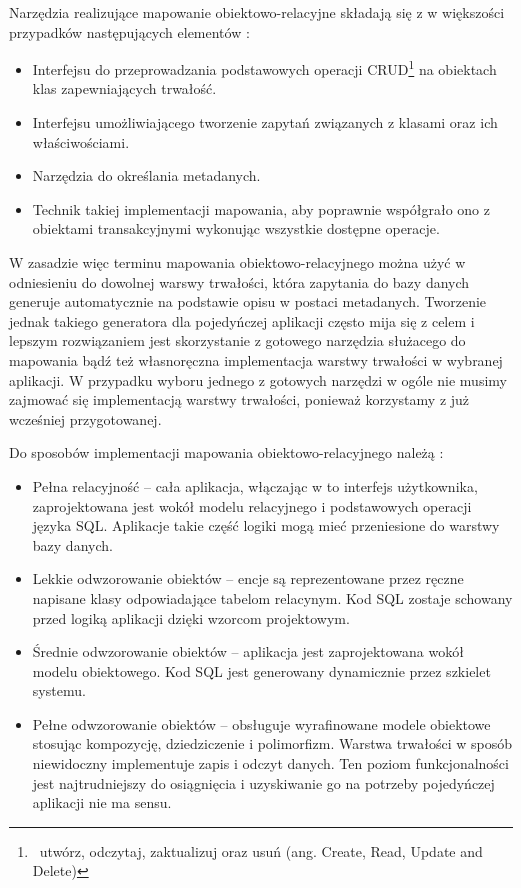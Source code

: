 \documentclass[12pt]{report}
\begin{document}
Narzędzia realizujące mapowanie obiektowo-relacyjne składają się z w wię\-kszości przypadków następujących elementów \cite{hibernate}:

\begin{itemize}
\item Interfejsu do przeprowadzania podstawowych operacji CRUD\footnote{~utwórz, odczytaj, zaktualizuj oraz usuń (ang. Create, Read, Update and Delete)} na obiektach
klas zapewniających trwałość.
\item Interfejsu umożliwiającego tworzenie zapytań związanych z klasami oraz ich właściwościami.
\item Narzędzia do określania metadanych.
\item Technik takiej implementacji mapowania, aby poprawnie współgrało ono z obiektami transakcyjnymi wykonując wszystkie dostępne operacje. 
\end{itemize}

W zasadzie więc terminu mapowania obiektowo-relacyjnego można użyć w odniesieniu do dowolnej warswy trwałości, która zapytania do bazy danych generuje automatycznie
na podstawie opisu w postaci metadanych. Tworzenie jednak takiego generatora dla pojedyńczej aplikacji często mija się z celem i lepszym rozwiązaniem jest skorzystanie z
gotowego narzędzia służacego do mapowania bądź też własnoręczna implementacja warstwy trwałości w wybranej aplikacji. W przypadku wyboru jednego z gotowych narzędzi
w ogóle nie musimy zajmować się implementacją warstwy trwałości, ponieważ korzystamy z już wcześniej przygotowanej.

Do sposobów implementacji mapowania obiektowo-relacyjnego należą \cite{hibernate}:

\begin{itemize}
\item Pełna relacyjność -- cała aplikacja, włączając w to interfejs użytkownika, zaprojektowana jest wokół modelu relacyjnego i podstawowych operacji języka SQL. Aplikacje
takie część logiki mogą mieć przeniesione do warstwy bazy danych.
\item Lekkie odwzorowanie obiektów -- encje są reprezentowane przez ręczne na\-pisane klasy odpowiadające tabelom relacynym. Kod SQL zostaje schowany przed logiką
aplikacji dzięki wzorcom projektowym.
\item Średnie odwzorowanie obiektów -- aplikacja jest zaprojektowana wokół modelu obiektowego. Kod SQL jest generowany dynamicznie przez szkielet systemu.
\item Pełne odwzorowanie obiektów -- obsługuje wyrafinowane modele obiektowe stosując kompozycję, dziedziczenie i polimorfizm. Warstwa trwałości w spo\-sób niewidoczny
implementuje zapis i odczyt danych. Ten poziom funkcjonalności jest najtrudniejszy do osiągnięcia i uzyskiwanie go na potrzeby pojedyńczej aplikacji nie ma sensu.
\end{itemize}
\end{document}
